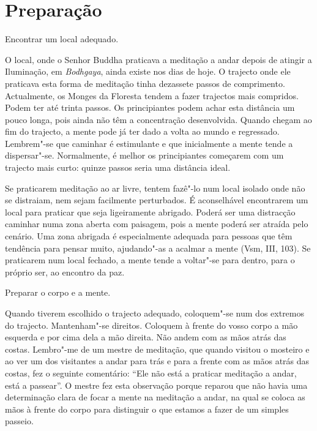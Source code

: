 
\chapter{Preparação}

\begin{siderule-quote}
  Encontrar um local adequado.
\end{siderule-quote}

O local, onde o Senhor Buddha praticava a meditação a andar depois de
atingir a Iluminação, em \emph{Bodhgaya}, ainda existe nos dias de hoje. O
trajecto onde ele praticava esta forma de meditação tinha dezassete passos de
comprimento. Actualmente, os Monges da Floresta tendem a fazer trajectos mais
compridos. Podem ter até trinta passos. Os principiantes podem achar esta
distância um pouco longa, pois ainda não têm a concentração desenvolvida. Quando
chegam ao fim do trajecto, a mente pode já ter dado a volta ao mundo e
regressado. Lembrem"-se que caminhar é estimulante e que inicialmente a mente
tende a dispersar"-se. Normalmente, é melhor os principiantes começarem com um
trajecto mais curto: quinze passos seria uma distância ideal.

Se praticarem meditação ao ar livre, tentem fazê"-lo num local isolado
onde não se distraiam, nem sejam facilmente perturbados. É aconselhável
encontrarem um local para praticar que seja ligeiramente abrigado.
Poderá ser uma distracção caminhar numa zona aberta com paisagem, pois a
mente poderá ser atraída pelo cenário. Uma zona abrigada é especialmente
adequada para pessoas que têm tendência para pensar muito, ajudando"-as a
acalmar a mente (Vsm, III, 103). Se praticarem num local fechado, a
mente tende a voltar"-se para dentro, para o próprio ser, ao encontro da
paz.

\begin{siderule-quote}
  Preparar o corpo e a mente.
\end{siderule-quote}

Quando tiverem escolhido o trajecto adequado, coloquem"-se num dos
extremos do trajecto. Mantenham"-se direitos. Coloquem à frente do vosso
corpo a mão esquerda e por cima dela a mão direita. Não andem com as
mãos atrás das costas. Lembro"-me de um mestre de meditação, que quando
visitou o mosteiro e ao ver um dos visitantes a andar para trás e para a
frente com as mãos atrás das costas, fez o seguinte comentário: ``Ele
não está a praticar meditação a andar, está a passear''. O mestre fez
esta observação porque reparou que não havia uma determinação clara de
focar a mente na meditação a andar, na qual se coloca as mãos à frente
do corpo para distinguir o que estamos a fazer de um simples passeio.

